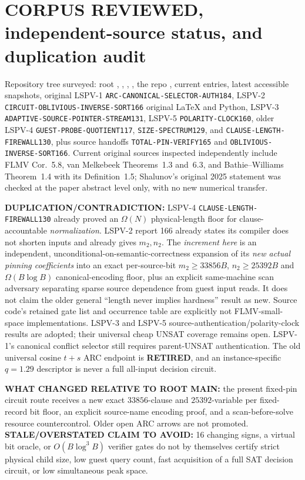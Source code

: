 \documentclass[11pt]{article}
\begin{document}
\section{CORPUS REVIEWED, independent-source status, and duplication audit}
Repository tree surveyed: root , , , , the repo , current  entries, latest accessible  snapshots, original LSPV-1 \texttt{ARC-CANONICAL-SELECTOR-AUTH184}, LSPV-2 \texttt{CIRCUIT-OBLIVIOUS-INVERSE-SORT166} original LaTeX and Python, LSPV-3 \texttt{ADAPTIVE-SOURCE-POINTER-STREAM131}, LSPV-5 \texttt{POLARITY-CLOCK160}, older LSPV-4 \texttt{GUEST-PROBE-QUOTIENT117}, \texttt{SIZE-SPECTRUM129}, and \texttt{CLAUSE-LENGTH-FIREWALL130}, plus source handoffs \texttt{TOTAL-PIN-VERIFY165} and \texttt{OBLIVIOUS-INVERSE-SORT166}. Current original sources inspected independently include FLMV Cor.~5.8, van Melkebeek Theorems~1.3 and~6.3, and Bathie--Williams Theorem~1.4 with its Definition~1.5; Shalunov's original 2025 statement was checked at the paper abstract level only, with no new numerical transfer.

\textbf{DUPLICATION/CONTRADICTION:} LSPV-4 \texttt{CLAUSE-LENGTH-FIREWALL130} already proved an $\Omega(N)$ physical-length floor for clause-accountable \emph{normalization}. LSPV-2 report 166 already states its compiler does not shorten inputs and already gives $m_2,n_2$. The \emph{increment here} is an independent, unconditional-on-semantic-correctness expansion of its \emph{new actual pinning coefficients} into an exact per-source-bit $m_2\ge33856B$, $n_2\ge25392B$ and $\Omega(B\log B)$ canonical-encoding floor, plus an explicit same-machine scan adversary separating sparse source dependence from guest input reads. It does not claim the older general ``length never implies hardness'' result as new. Source code's retained gate list and occurrence table are explicitly not FLMV-small-space implementations. LSPV-3 and LSPV-5 source-authentication/polarity-clock results are adopted; their universal cheap UNSAT coverage remains open. LSPV-1's canonical conflict selector still requires parent-UNSAT authentication. The old universal cosine $t+s$ ARC endpoint is \textbf{RETIRED}, and an instance-specific $q=1.29$ descriptor is never a full all-input decision circuit.

\textbf{WHAT CHANGED RELATIVE TO ROOT MAIN:} the present fixed-pin circuit route receives a new exact $33856$-clause and $25392$-variable per fixed-record bit floor, an explicit source-name encoding proof, and a scan-before-solve resource countercontrol. Older open ARC arrows are not promoted. \textbf{STALE/OVERSTATED CLAIM TO AVOID:} 16 changing signs, a virtual bit oracle, or $O(B\log^3 B)$ verifier gates do not by themselves certify strict physical child size, low guest query count, fast acquisition of a full SAT decision circuit, or low simultaneous peak space.
\end{document}
